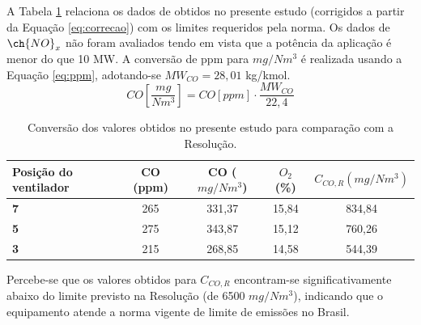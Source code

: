 A Tabela \ref{tab:comparacaoCONAMA} relaciona os dados de  obtidos no presente estudo (corrigidos a partir da Equação \eqref{eq:correcao}) com os limites requeridos pela norma. Os dados de $\ch{NO}_x$ não foram avaliados tendo em vista que a potência da aplicação é menor do que 10 MW. A conversão de ppm para $mg/Nm^3$ é realizada usando a Equação \eqref{eq:ppm}, adotando-se $MW_{CO} = 28,01$ kg/kmol.
\begin{equation} \label{eq:ppm}
    CO \left[\frac{mg}{Nm^3}\right] = CO [ppm]\cdot \frac{MW_{CO}}{22,4}
\end{equation}

\begin{table}[!htbp]
	\centering
	\small
	\renewcommand{\arraystretch}{1.3}
	\caption{Conversão dos valores obtidos no presente estudo para comparação com a Resolução.}%
	\label{tab:comparacaoCONAMA}
        \begin{tabular}{|l|c|c|c|c|}
        \hline
        \textbf{Posição do ventilador} & CO (ppm) & CO ($mg/Nm^3$) & $O_2$ (\%) & $C_{CO, R} (mg/Nm^3)$ \\ \hline
        \textbf{7}                     & 265      & 331,37            & 15,84        & 834,84                \\ \hline
        \textbf{5}                     & 275       & 343,87             & 15,12         & 760,26                \\ \hline
        \textbf{3}                     & 215     & 268,85           & 14,58       & 544,39                \\ \hline
        \end{tabular}
    \vspace{2mm}
\end{table}

Percebe-se que os valores obtidos para $C_{CO,R}$ encontram-se significativamente abaixo do limite previsto na Resolução (de 6500 $mg/Nm^3$), indicando que o equipamento atende a norma vigente de limite de emissões no Brasil. 


